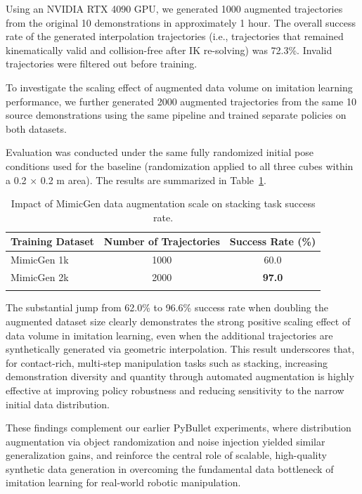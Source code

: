 \documentclass{article} %
\begin{document}
Using an NVIDIA RTX 4090 GPU, we generated 1000 augmented trajectories from the original 10 demonstrations in approximately 1 hour. The overall success rate of the generated interpolation trajectories (i.e., trajectories that remained kinematically valid and collision-free after IK re-solving) was 72.3\%. Invalid trajectories were filtered out before training.

To investigate the scaling effect of augmented data volume on imitation learning performance, we further generated 2000 augmented trajectories from the same 10 source demonstrations using the same pipeline and trained separate policies on both datasets.

Evaluation was conducted under the same fully randomized initial pose conditions used for the baseline (randomization applied to all three cubes within a 0.2 × 0.2 m area). The results are summarized in Table~\ref{tab:mimicgen_scaling}.

\begin{table}[ht]
\centering
\caption{Impact of MimicGen data augmentation scale on stacking task success rate.}

\begin{tabular}{l c c}
\toprule
{\bfseries Training Dataset} & {\bfseries Number of Trajectories} & {\bfseries Success Rate (\%)} \\
\midrule
MimicGen 1k & 1000  & 60.0 \\
MimicGen 2k & 2000  & {\bfseries 97.0} \\
\bottomrule
\label{tab:mimicgen_scaling}
\end{tabular}
\end{table}

The substantial jump from 62.0\% to 96.6\% success rate when doubling the augmented dataset size clearly demonstrates the strong positive scaling effect of data volume in imitation learning, even when the additional trajectories are synthetically generated via geometric interpolation. This result underscores that, for contact-rich, multi-step manipulation tasks such as stacking, increasing demonstration diversity and quantity through automated augmentation is highly effective at improving policy robustness and reducing sensitivity to the narrow initial data distribution.

These findings complement our earlier PyBullet experiments, where distribution augmentation via object randomization and noise injection yielded similar generalization gains, and reinforce the central role of scalable, high-quality synthetic data generation in overcoming the fundamental data bottleneck of imitation learning for real-world robotic manipulation.
\end{document}
